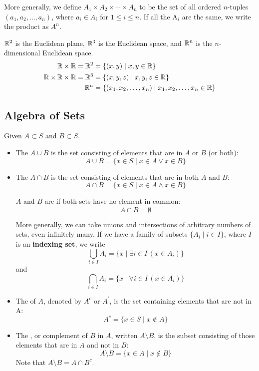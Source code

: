 \begin{itemize}
More generally, we define $A_1 \times A_2 \times \cdots \times A_n$ to be the set of all ordered $n$-tuples $(a_1, a_2, \dots, a_n)$, where $a_i \in A_i$ for $1 \le i \le n$. If all the A$_i$ are the same, we write the product as $A^n$.

\begin{exmp}{}{}
$\mathbb R^2$ is the Euclidean plane, $\mathbb R^3$ is the Euclidean space, and $\mathbb R^n$ is the $n$-dimensional Euclidean space.
\begin{align*}
\mathbb R \times \mathbb R = \mathbb R^2 &= \{(x,y) \mid x,y \in \mathbb R\} \\
\mathbb R \times \mathbb R \times \mathbb R = \mathbb R^3 &= \{(x,y,z) \mid x,y,z \in \mathbb R\} \\
\mathbb R^n &= \{(x_1,x_2,\dots,x_n) \mid x_1,x_2,\dots,x_n \in \mathbb R\}
\end{align*}
\end{exmp}
\end{itemize}

\subsection{Algebra of Sets}
Given $A \subset S$ and $B \subset S$.
\begin{itemize}
\item The  $A \cup B$ is the set consisting of elements that are in $A$ or $B$ (or both):
\[ A\cup B=\{x \in S \mid x\in A \lor x\in B\} \]

\item The  $A \cap B$ is the set consisting of elements that are in both $A$ and $B$:
\[ A\cap B=\{x \in S \mid x\in A \land x\in B\} \]

$A$ and $B$ are  if both sets have no element in common:
\[ A\cap B = \emptyset \]

More generally, we can take unions and intersections of arbitrary numbers of sets, even infinitely many. If we have a family of subsets $\{A_i \mid i \in I\}$, where $I$ is an \textbf{indexing set}, we write
\[ \bigcup_{i\in I} A_i = \{x \mid \exists i\in I\,(x\in A_i)\} \]
and
\[ \bigcap_{i\in I} A_i = \{x \mid \forall i\in I\,(x\in A_i)\} \] 

\item The  of $A$, denoted by $A^c$ or $A^\prime$, is the set containing elements that are not in A:
\[ A^c = \{x \in S \mid x \notin A\} \]

\item The , or complement of $B$ in $A$, written $A\setminus B$, is the subset consisting of those elements that are in $A$ and not in $B$:
\[ A\setminus B = \{x \in A \mid x \notin B\} \]
Note that $A\setminus B = A \cap B^c$.
\end{itemize}

